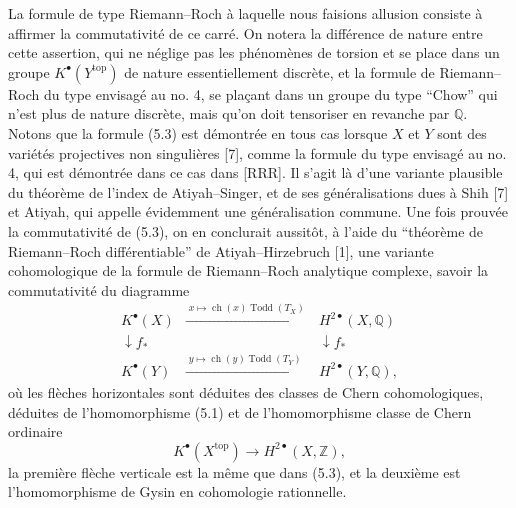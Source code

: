 \documentclass[11pt]{article}
\newcommand{\ch}{\operatorname{ch}}
\newcommand{\Todd}{\operatorname{Todd}}
\providecommand{\ch}{\operatorname{ch}}
\providecommand{\Todd}{\operatorname{Todd}}
\begin{document}
La formule de type Riemann--Roch \`a laquelle nous faisions allusion consiste \`a affirmer la commutativit\'e de ce carr\'e. On notera la diff\'erence de nature entre cette assertion, qui ne n\'eglige pas les ph\'enom\`enes de torsion et se place dans un groupe $K^\bullet(Y^{\mathrm{top}})$ de nature essentiellement discr\`ete, et la formule de Riemann--Roch du type envisag\'e au no. 4, se pla\c{c}ant dans un groupe du type ``Chow'' qui n'est plus de nature discr\`ete, mais qu'on doit tensoriser en revanche par $\mathbb Q$. Notons que la formule (5.3) est d\'emontr\'ee en tous cas lorsque $X$ et $Y$ sont des vari\'et\'es projectives non singuli\`eres [7], comme la formule du type envisag\'e au no. 4, qui est d\'emontr\'ee dans ce cas dans [RRR]. Il s'agit l\`a d'une variante plausible du th\'eor\`eme de l'index de Atiyah--Singer, et de ses g\'en\'eralisations dues \`a Shih [7] et Atiyah, qui appelle \'evidemment une g\'en\'eralisation commune. Une fois prouv\'ee la commutativit\'e de (5.3), on en conclurait aussit\^ot, \`a l'aide du ``th\'eor\`eme de Riemann--Roch diff\'erentiable'' de Atiyah--Hirzebruch [1], une variante cohomologique de la formule de Riemann--Roch analytique complexe, savoir la commutativit\'e du diagramme
\begin{equation}\tag{5.4}
\begin{array}{ccc}
K^\bullet(X) & \xrightarrow{\;x\mapsto \ch(x)\Todd(T_X)\;} & H^{2\bullet}(X,\mathbb Q) \\
\downarrow f_* && \downarrow f_* \\
K^\bullet(Y) & \xrightarrow{\;y\mapsto \ch(y)\Todd(T_Y)\;} & H^{2\bullet}(Y,\mathbb Q),
\end{array}
\end{equation}
o\`u les fl\`eches horizontales sont d\'eduites des classes de Chern cohomologiques, d\'eduites de l'homomorphisme (5.1) et de l'homomorphisme classe de Chern ordinaire
\[
K^\bullet(X^{\mathrm{top}})\longrightarrow H^{2\bullet}(X,\mathbb Z),
\]
la premi\`ere fl\`eche verticale est la m\^eme que dans (5.3), et la deuxi\`eme est l'homomorphisme de Gysin en cohomologie rationnelle.
\end{document}
